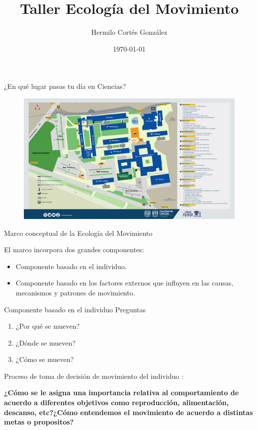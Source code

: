 \documentclass[11pt]{beamer}
\author{Hermilo Cortés González}
\title{Taller Ecología del Movimiento}
\date{\today}
\begin{document}
\begin{frame}
\titlepage
\end{frame}


\begin{frame}{¿En qué lugar pasas tu día en Ciencias?}
	\begin{figure}
		\includegraphics[scale=0.28]{images/MAPA_Fac_2021.jpg}
	\end{figure}
\end{frame}


\begin{frame}{Marco conceptual de la Ecología del Movimiento \cite{nathan2008movement}}

El marco incorpora dos grandes componentes: 
	\begin{itemize}
		\item Componente basado en el individuo.
		\item Componente basado en los factores externos que influyen en las causas, mecanismos y patrones de movimiento.
	\end{itemize}


\end{frame}

\begin{frame}{Componente basado en el individuo}
Preguntas

	\begin{enumerate}
		\item ¿Por qué se mueven?
		\item ¿Dónde se mueven?
		\item ¿Cómo se mueven?			
	\end{enumerate}	

Proceso de toma de decisión de movimiento del individuo :			
				\begin{center}
					 \textbf{¿Cómo se le asigna una importancia relativa al comportamiento de acuerdo a diferentes objetivos como reproducción, alimentación, descanso, etc?¿Cómo entendemos el movimiento de acuerdo a distintas metas o propositos?}
				\end{center}
\end{frame}
\end{document}
